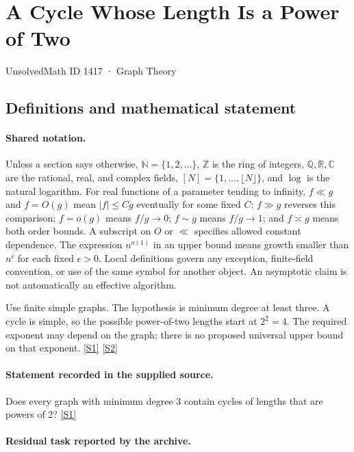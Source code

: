 \documentclass[11pt,a4paper]{article}
\newcommand{\N}{\mathbb{N}}
\newcommand{\Z}{\mathbb{Z}}
\newcommand{\Q}{\mathbb{Q}}
\newcommand{\R}{\mathbb{R}}
\newcommand{\C}{\mathbb{C}}
\newcommand{\sref}[2]{\hyperlink{source:#1:#2}{[S#2]}}
\begin{document}

\setcounter{section}{1416}

\section{A Cycle Whose Length Is a Power of Two}\label{1417}

{\small\sffamily UnsolvedMath ID 1417 · Graph Theory}

\subsection{Definitions and mathematical statement}

\paragraph{Shared notation.}Unless a section says otherwise, $\N=\{1,2,\ldots\}$,
$\Z$ is the ring of integers, $\Q,\R,\C$ are the rational, real, and complex
fields, $[N]=\{1,\ldots,\lfloor N\rfloor\}$, and $\log$ is the natural
logarithm. For real functions of a parameter tending to infinity,
$f\ll g$ and $f=O(g)$ mean $|f|\leq Cg$ eventually for some fixed $C$;
$f\gg g$ reverses this comparison; $f=o(g)$ means $f/g\to0$;
$f\sim g$ means $f/g\to1$; and $f\asymp g$ means both order bounds.
A subscript on $O$ or $\ll$ specifies allowed constant dependence.
The expression $n^{o(1)}$ in an upper bound means growth smaller than
$n^\epsilon$ for each fixed $\epsilon>0$. Local definitions govern any
exception, finite-field convention, or use of the same symbol for another
object. An asymptotic claim is not automatically an effective algorithm.



Use finite simple graphs. The hypothesis is minimum degree at least three. A cycle is simple, so the possible power-of-two lengths start at $2^2=4$. The required exponent may depend on the graph; there is no proposed universal upper bound on that exponent. \sref{1417}{1} \sref{1417}{2}

\paragraph{Statement recorded in the supplied source.}
Does every graph with minimum degree 3 contain cycles of lengths that are powers of 2? \sref{1417}{1}

\paragraph{Residual task reported by the archive.}
\end{document}
